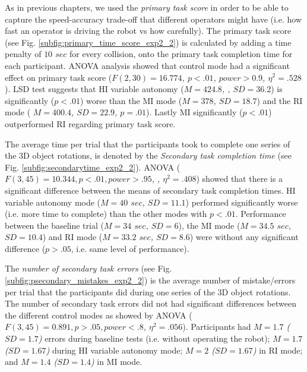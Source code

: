 \documentclass[a4paper,12pt,oneside,openright]{bhamthesis}
\begin{document}
As in previous chapters, we used the \textit{primary task score} in order to be able to capture the speed-accuracy trade-off that different operators might have (i.e. how fast an operator is driving the robot vs how carefully). The primary task score (see Fig. \ref{subfig:primary_time_score_exp2_2}) is calculated by adding a time penalty of \textit{$10$ $sec$} for every collision, onto the primary task completion time for each participant. ANOVA analysis showed that control mode had a significant effect on primary task score (\textit{$F(2, 30) = 16.774$, $p < .01$, $power > 0.9$, $\eta^2 = .528$}). LSD test suggests that HI variable autonomy (\textit{$M = 424.8$, , $SD = 36.2$}) is significantly (\textit{$p <.01$}) worse than the MI mode (\textit{$M = 378$, $SD = 18.7$}) and the RI mode ( \textit{$M = 400.4$, $SD = 22.9$, $p =.01$}). Lastly MI significantly (\textit{$p <.01$}) outperformed RI regarding primary task score. 

The average time per trial that the participants took to complete one series of the 3D object rotations, is denoted by the \textit{Secondary task completion time} (see Fig. \ref{subfig:secondarytime_exp2_2}). ANOVA (\textit{$F(3, 45) = 10.344, p < .01 , power > .95$, , $\eta^2 = .408$}) showed that there is a significant difference between the means of secondary task completion times. HI variable autonomy mode (\textit{$M = 40$ $sec$, $SD = 11.1$}) performed significantly worse (i.e. more time to complete) than the other modes with $p < .01$. Performance between the baseline trial (\textit{$M = 34$ $sec$, $SD = 6$}), the MI mode (\textit{$M = 34.5$ $sec$, $SD = 10.4$}) and RI mode (\textit{$M = 33.2$ $sec$, $SD = 8.6$}) were without any significant difference ($p > .05$, i.e. same level of performance).

The \textit{number of secondary task errors} (see Fig. \ref{subfig:psecondary_mistakes_exp2_2}) is the average number of mistake/errors per trial that the participants did during one series of the 3D object rotations. The number of secondary task errors did not had significant differences between the different control modes as showed by ANOVA  (\textit{$F(3, 45) = 0.891, p > .05 , power < .8$, $\eta^2 = .056$}). Participants had \textit{$M = 1.7$ ($SD = 1.7$)} errors during baseline tests (i.e. without operating the robot); \textit{$M = 1.7$ ($SD = 1.67$)} during HI variable autonomy mode; \textit{$M = 2$ ($SD = 1.67$)} in RI mode; and \textit{$M = 1.4$ ($SD = 1.4$)} in MI mode.
\end{document}

